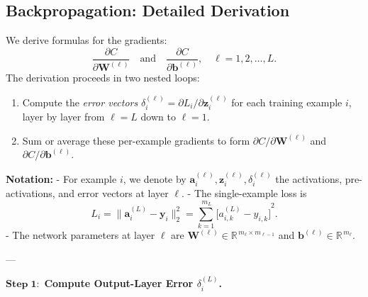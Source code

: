 \documentclass{article}
\begin{document}
\subsection{Backpropagation: Detailed Derivation}\label{sec:n-inputs-layers-backprop}

\noindent We derive formulas for the gradients:
\[
    \frac{\partial C}{\partial \mathbf{W}^{(\ell)}}
    \quad\text{and}\quad
    \frac{\partial C}{\partial \mathbf{b}^{(\ell)}}, 
    \quad \ell = 1,2,\dots,L.
\]
The derivation proceeds in two nested loops:
\begin{enumerate}
    \item Compute the \emph{error vectors} \(\delta_{i}^{(\ell)} = \partial L_{i}/\partial \mathbf{z}_{i}^{(\ell)}\) for each training example \(i\), layer by layer from \(\ell=L\) down to \(\ell=1\).  
    \item Sum or average these per-example gradients to form \(\partial C/\partial \mathbf{W}^{(\ell)}\) and \(\partial C/\partial \mathbf{b}^{(\ell)}\).
\end{enumerate}

\vspace{0.5em}
\noindent \textbf{Notation:}  
- For example \(i\), we denote by
  \(\mathbf{a}_{i}^{(\ell)}, \mathbf{z}_{i}^{(\ell)}, \delta_{i}^{(\ell)}\) 
  the activations, pre-activations, and error vectors at layer \(\ell\).  
- The single-example loss is 
  \[
    L_{i} 
    = \bigl\|\mathbf{a}_{i}^{(L)} - \mathbf{y}_{i}\bigr\|_{2}^{2}
    = \sum_{k=1}^{\,m_{L}}
      {\bigl[a_{i,k}^{(L)} - y_{i,k}\bigr]}^{2}.
  \]
- The network parameters at layer \(\ell\) are \(\mathbf{W}^{(\ell)}\in\mathbb{R}^{\,m_{\ell}\times m_{\ell-1}}\) and \(\mathbf{b}^{(\ell)}\in\mathbb{R}^{\,m_{\ell}}\).

---

\noindent\(\mathbf{Step\;1:}\) \textbf{Compute Output-Layer Error \(\delta_{i}^{(L)}\).}
\end{document}
